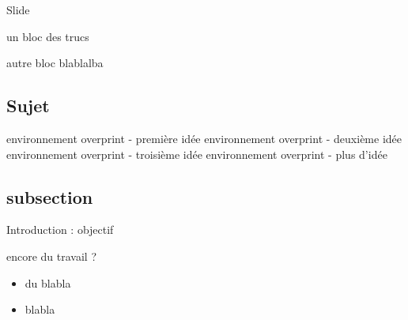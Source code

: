 \begin{frame}{Slide}

\begin{block}{un bloc}
    des trucs
\end{block}

\begin{block}{autre bloc}
	blablalba
\end{block}

\end{frame}


\subsection{Sujet}
\begin{frame}{\subsecname}
\begin{overprint}
	 environnement overprint - première idée 
	\onslide<2> environnement overprint - deuxième idée 
	\onslide<3> environnement overprint - troisième idée 
	\onslide<4> environnement overprint - plus d'idée 
\end{overprint} 
\end{frame}

\subsection{subsection}
\begin{frame}{Introduction : objectif}

encore du travail ?

\begin{itemize}
\item du blabla 
\item blabla 
\end{itemize}


\end{frame}

